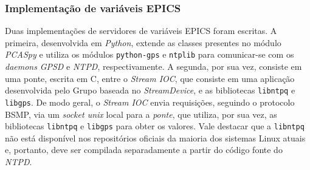 % 
% 
% 

\subsubsection{Implementação de variáveis EPICS}
\label{sec:pvsgps}

Duas implementações de servidores de variáveis EPICS foram escritas. A primeira,
desenvolvida em \textit{Python}, extende as classes presentes no módulo
\textit{PCASpy} e utiliza os módulos \texttt{python-gps} e \texttt{ntplib} para
comunicar-se com os \textit{daemons} \textit{GPSD} e \textit{NTPD},
respectivamente. A segunda, por sua vez, consiste em uma ponte, escrita em C,
entre o \textit{Stream IOC}, que consiste em uma aplicação desenvolvida pelo
Grupo baseada no \textit{StreamDevice}, e as bibliotecas \texttt{libntpq} e
\texttt{libgps}.
De modo geral, o \textit{Stream IOC} envia requisições, seguindo o protocolo
BSMP, via um \textit{socket unix} local para a \textit{ponte}, que utiliza, por
sua vez, as bibliotecas \texttt{libntpq} e \texttt{libgps} para obter os valores. Vale
destacar que a \texttt{libntpq} não está disponível nos repositórios oficiais da
maioria dos sistemas Linux atuais e, portanto, deve ser compilada separadamente
a partir do código fonte do \textit{NTPD}.

